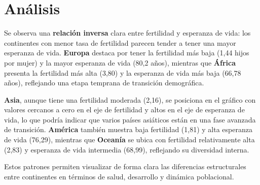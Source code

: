 \documentclass{article}
\begin{document}
\section{Análisis}

Se observa una \textbf{relación inversa} clara entre fertilidad y esperanza de vida: los continentes con menor tasa de fertilidad parecen tender a tener una mayor esperanza de vida. \textbf{Europa} destaca por tener la fertilidad más baja (1,44 hijos por mujer) y la mayor esperanza de vida (80,2 años), mientras que \textbf{África} presenta la fertilidad más alta (3,80) y la esperanza de vida más baja (66,78 años), reflejando una etapa temprana de transición demográfica.

\textbf{Asia}, aunque tiene una fertilidad moderada (2,16), se posiciona en el gráfico con valores cercanos a cero en el eje de fertilidad y altos en el eje de esperanza de vida, lo que podría indicar que varios países asiáticos están en una fase avanzada de transición. \textbf{América} también muestra baja fertilidad (1,81) y alta esperanza de vida (76,29), mientras que \textbf{Oceanía} se ubica con fertilidad relativamente alta (2,83) y esperanza de vida intermedia (68,99), reflejando su diversidad interna.

Estos patrones permiten visualizar de forma clara las diferencias estructurales entre continentes en términos de salud, desarrollo y dinámica poblacional.
\end{document}
